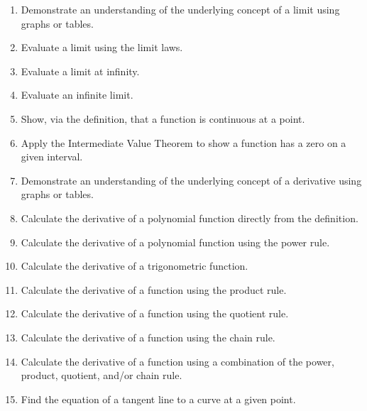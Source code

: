 \documentclass[12pt,landscape]{article}
\begin{document}
\begin{multicols}{2}
\begin{enumerate}
\item Demonstrate an understanding of the underlying concept of a limit using graphs or tables.\\
%
\item Evaluate a limit using the limit laws.\\
\item Evaluate a limit at infinity.\\
\item Evaluate an infinite limit.\\
%
\item Show, via the definition, that a function is continuous at a point.\\
\item Apply the Intermediate Value Theorem to show a function has a zero on a given interval.\\
\item Demonstrate an understanding of the underlying concept of a derivative using graphs or tables.\\
%
\item Calculate the derivative of a polynomial function directly from the definition.\\
\item Calculate the derivative of a polynomial function using the power rule.\\
\item Calculate the derivative of a trigonometric function.\\
\item Calculate the derivative of a function using the product rule.\\ 
\item Calculate the derivative of a function using the quotient rule.\\
\item Calculate the derivative of a function using the chain rule.\\
\item Calculate the derivative of a function using a combination of the power, product, quotient, and/or chain rule.\\
\item Find the equation of a tangent line to a curve at a given point.\\

\end{enumerate}
\end{multicols}
\end{document}
